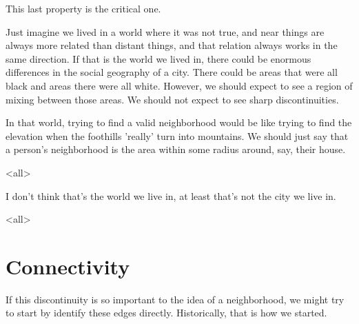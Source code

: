 \noindent This last property is the critical one. 

Just imagine we lived in a world where it was not true, and near
things are always more related than distant things, and that relation
always works in the same direction. If that is the world we lived in,
there could be enormous differences in the social geography of a
city. There could be areas that were all black and areas there were
all white. However, we should expect to see a region of mixing between
those areas. We should not expect to see sharp discontinuities.

In that world, trying to find a valid neighborhood would be like
trying to find the elevation when the foothills 'really' turn into
mountains. We should just say that a person's neighborhood is the area
within some radius around, say, their house.

\mode<all>{
}

I don't think that's the world we live in, at least that's not the
city we live in. 


\mode<all>{
\blackout{}
}  

\section{Connectivity}

If this discontinuity is so important to the idea of a neighborhood,
we might try to start by identify these edges directly. Historically,
that is how we started.


